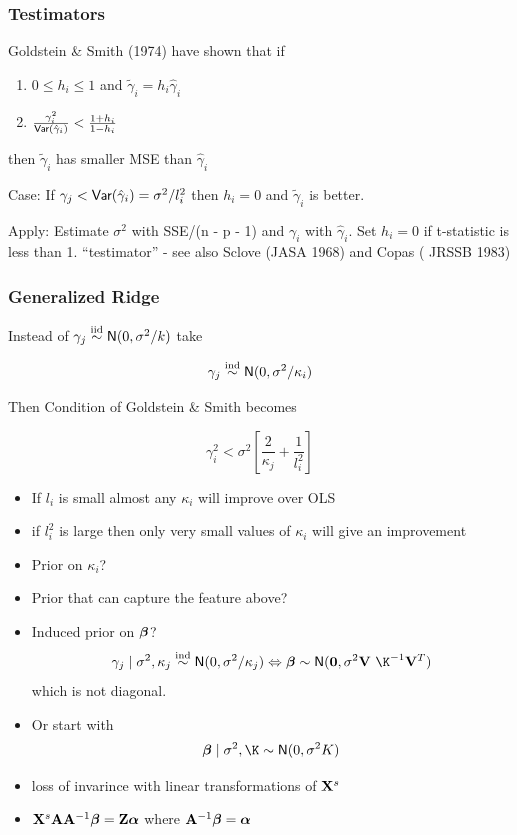 \documentclass[handout]{beamer}
\begin{document}
\begin{frame} \frametitle{Testimators}

Goldstein \& Smith (1974) have shown that if

\begin{enumerate}
\item
$0 \leq  h_i \leq 1$ and  $\tilde{\gamma}_i = h_i \hat{\gamma}_i$  
\item $\frac{\gamma^2_i}{\textsf{Var}(\hat{\gamma}_i)} < \frac{1 + h_i}{1 - h_i}$
\end{enumerate}
then   $\tilde{\gamma}_i$ has smaller MSE than $\hat{\gamma}_i$

\vspace{14pt}
Case:  If $\gamma_j < \textsf{Var}(\hat{\gamma}_i) = \sigma^2/l_i^2$  then
$h_i = 0$ and $\tilde{\gamma}_i$ is better.

\vspace{11pt}
Apply: Estimate $\sigma^2$ with SSE/(n - p - 1) and $\gamma_i$ with
$\hat{\gamma}_i$.  Set $h_i = 0$ if t-statistic is less than 1.
\vfill 
``testimator'' - see also Sclove (JASA 1968) and Copas ( JRSSB 1983)
\end{frame}
\begin{frame} \frametitle{Generalized Ridge}


Instead of $\gamma_j \mathrel{\mathop{\sim}\limits^{\rm iid}} \textsf{N}(0, \sigma^2/k)$ take 

$$\gamma_j \mathrel{\mathop{\sim}\limits^{\rm ind}} \textsf{N}(0, \sigma^2/\kappa_i)$$  \pause

Then Condition of Goldstein \& Smith becomes

$$
\gamma_i^2 < \sigma^2\left[ \frac{2}{\kappa_j} + \frac{1}{l_i^2}  \right]
$$ \pause
\begin{itemize}
\item 
If $l_i$ is small almost any $\kappa_i$ will improve over OLS \pause
\item 
if $l_i^2$ is large then only very small values of $\kappa_i$ will give an
improvement \pause
\item Prior on $\kappa_i$?   \pause
\item Prior that can capture the feature above?

\end{itemize}

\end{frame}
\begin{frame}
  \begin{itemize}
\item Induced prior on $\boldsymbol{\beta}$?  
$$\gamma_j \mid \sigma^2, \kappa_j  \ind \N(0, \sigma^2/\kappa_j) \Leftrightarrow 
\b \sim \N(\zero, \sigma^2 \V\ \K^{-1} \V^T)$$
which is not diagonal.   
  \item  Or start with $$\b  \mid \sigma^2, \K \sim \N(0, \sigma^2 K)$$
 \item loss of invarince with linear transformations of $\mathbf{X}^s$
\item $\mathbf{X}^s \mathbf{A} \mathbf{A}^{-1} \boldsymbol{\beta} = \mathbf{Z} \boldsymbol{\alpha}$ where $\mathbf{A}^{-1} \boldsymbol{\beta} = \boldsymbol{\alpha}$
  \end{itemize}
\end{frame}
\end{document}
